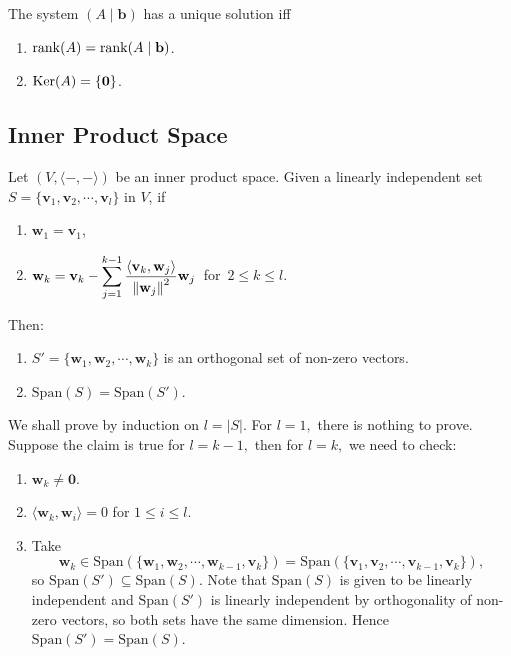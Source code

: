\documentclass[12pt]{article}
\begin{document}
\begin{corollary}
    The system $(A\mid\mathbf{b})$ has a unique solution iff
    \begin{enumerate}
        \item $\operatorname{rank}(A)=\operatorname{rank}(A\mid\mathbf{b})$.
        \item $\operatorname{Ker}(A)=\{\mathbf{0}\}$.
    \end{enumerate}
\end{corollary}


\subsection{Inner Product Space}

\begin{theorem}
    Let $(V,\langle-,-\rangle)$ be an inner product space. Given a linearly independent set $S=\{\mathbf{v}_1,\mathbf{v}_2,\cdots,\mathbf{v}_l\}$ in $V$, if
    \begin{enumerate}
        \item $\mathbf{w}_1=\mathbf{v}_1$,
        \item $\mathbf{w}_k=\mathbf{v}_k-\displaystyle\sum_{j=1}^{k-1}\frac{\langle \mathbf{v}_k, \mathbf{w}_j\rangle}{\left\lVert \mathbf{w}_j \right\rVert^2}\mathbf{w}_j\,$ for $\,2\le k\le l.$
    \end{enumerate} 
    Then:
    \begin{enumerate}
        \item $S'=\{\mathbf{w}_1,\mathbf{w}_2,\cdots,\mathbf{w}_k\}$ is an orthogonal set of non-zero vectors.
        \item $\mathrm{Span}(S)=\mathrm{Span}(S').$
    \end{enumerate}
\end{theorem}

\begin{pfbox}
    We shall prove by induction on $l=|S|.$
    For $l=1,$ there is nothing to prove. Suppose the claim is true for $l=k-1,$ then for $l=k,$
    we need to check:
    \begin{enumerate}
        \item $\mathbf{w}_k\neq \mathbf{0}.$
        \item $\langle \mathbf{w}_k, \mathbf{w}_i\rangle=0$ for $1\le i\le l$.
        \item Take 
        $$\mathbf{w}_k\in\mathrm{Span}(\{\mathbf{w}_1,\mathbf{w}_2,\cdots,\mathbf{w}_{k-1},\mathbf{v}_{k}\})=\mathrm{Span}(\{\mathbf{v}_1,\mathbf{v}_2,\cdots,\mathbf{v}_{k-1},\mathbf{v}_{k}\}),$$ 
        so $\mathrm{Span}(S')\subseteq\mathrm{Span}(S).$
        Note that $\mathrm{Span}(S)$ is given to be linearly independent and $\mathrm{Span}(S')$ is linearly independent by orthogonality of non-zero vectors, so both sets have the same dimension. Hence $\mathrm{Span}(S')=\mathrm{Span}(S).$
    \end{enumerate}
\end{pfbox}
\end{document}
